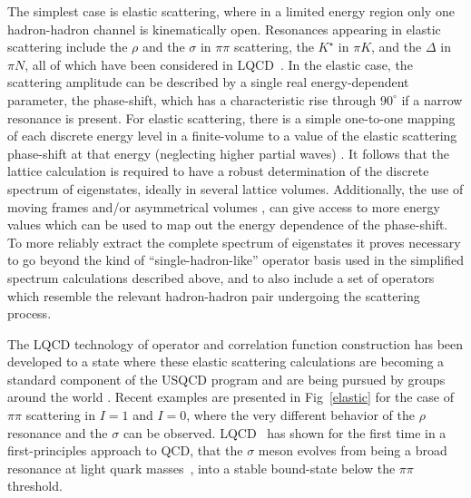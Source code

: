The simplest case is elastic scattering, where in a limited energy region only one hadron-hadron channel is kinematically open. Resonances appearing in elastic scattering include the $\rho$ and the $\sigma$ in $\pi\pi$ scattering, the $K^\star$ in $\pi K$, and the $\Delta$ in $\pi N$, all of which have been considered in LQCD~\cite{Aoki:2007rd,Feng:2010es,Lang:2011mn,Aoki:2011yj,Dudek:2012xn,Pelissier:2012pi,Wilson:2015dqa,Bali:2015gji,Bulava:2016mks,Guo:2016zos,Briceno:2016mjc,Guo:2018zss,Bali:2015gji,Lang:2012sv,Fu:2012tj,Prelovsek:2013ela,Brett:2018jqw,Andersen:2017una}.
%
In the elastic case, the scattering amplitude can be described by a single real energy-dependent parameter, the phase-shift, which has a characteristic rise through $90^\circ$ if a narrow resonance is present. For elastic scattering, there is a simple one-to-one mapping of each discrete energy level in a finite-volume to a value of the elastic scattering phase-shift at that energy (neglecting higher partial waves) \cite{Luscher:1986pf,Luscher:1990ck}. It follows that the lattice calculation is required to have a robust determination of the discrete spectrum of eigenstates, ideally in several lattice volumes. Additionally, the use of moving frames \cite{Rummukainen:1995vs} and/or asymmetrical volumes \cite{Li:2003jn,Detmold:2004qn}, can give access to more energy values which can be used to map out the energy dependence of the phase-shift. To more reliably extract the complete spectrum of eigenstates it proves necessary to go beyond the kind of ``single-hadron-like'' operator basis used in the simplified  spectrum calculations described above, and to also include a set of operators which resemble the relevant hadron-hadron pair undergoing the scattering process.

The LQCD technology of operator and correlation function construction has been developed to a state where these elastic scattering calculations are becoming a standard component of the USQCD program and are being pursued by groups around the world \cite{Aoki:2007rd,Feng:2010es,Lang:2011mn,Aoki:2011yj,Dudek:2012xn,Pelissier:2012pi,Mohler:2012na,Prelovsek:2013cra,Lang:2014yfa,Bali:2015gji,Lang:2015sba,Lang:2016jpk,Bulava:2016mks}. Recent examples are presented in Fig~\ref{elastic} for the case of $\pi\pi$ scattering in $I=1$ and $I=0$, where the very different behavior of the $\rho$ resonance and the $\sigma$ can be observed. LQCD~\cite{Briceno:2016mjc} has shown for the first time in a first-principles approach to QCD, that the $\sigma$ meson evolves from being a broad resonance at light quark masses~\cite{Guo:2018zss}, into a stable bound-state below the $\pi\pi$ threshold. 

